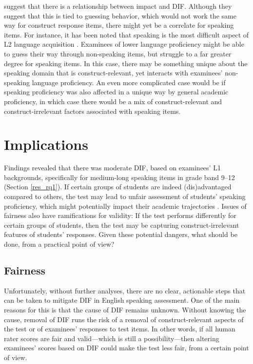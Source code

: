 \documentclass [PhD] {uclathes}
\begin{document}
\citet{dorans2004examining} suggest that there is a relationship between impact and DIF. Although they suggest that this is tied to guessing behavior, which would not work the same way for construct response items, there might yet be a correlate for speaking items. For instance, it has been noted that speaking is the most difficult aspect of L2 language acquisition \citep{brown2000principles}. Examinees of lower language proficiency might be able to guess their way through non-speaking items, but struggle to a far greater degree for speaking items. In this case, there may be something unique about the speaking domain that is construct-relevant, yet interacts with examinees’ non-speaking language proficiency. An even more complicated case would be if speaking proficiency was also affected in a unique way by general academic proficiency, in which case there would be a mix of construct-relevant and construct-irrelevant factors associated with speaking items. 

\section{Implications}
\label{sec:implications}

Findings revealed that there was moderate DIF, based on examinees’ L1 backgrounds, specifically for medium-long speaking items in grade band 9–12 (Section \ref{res_rq1}). If certain groups of students are indeed (dis)advantaged compared to others, the test may lead to unfair assessment of students’ speaking proficiency, which might potentially impact their academic trajectories \citep{johnson2019effects}. Issues of fairness also have ramifications for validity: If the test performs differently for certain groups of students, then the test may be capturing construct-irrelevant features of students’ responses. Given these potential dangers, what should be done, from a practical point of view?

\subsection{Fairness}

Unfortunately, without further analyses, there are no clear, actionable steps that can be taken to mitigate DIF in English speaking assessment. One of the main reasons for this is that the cause of DIF remains unknown. Without knowing the cause, removal of DIF runs the risk of a removal of construct-relevant aspects of the test or of examinees’ responses to test items. In other words, if all human rater scores are fair and valid—which is still a possibility—then altering examinees’ scores based on DIF could make the test less fair, from a certain point of view. 
\end{document}
